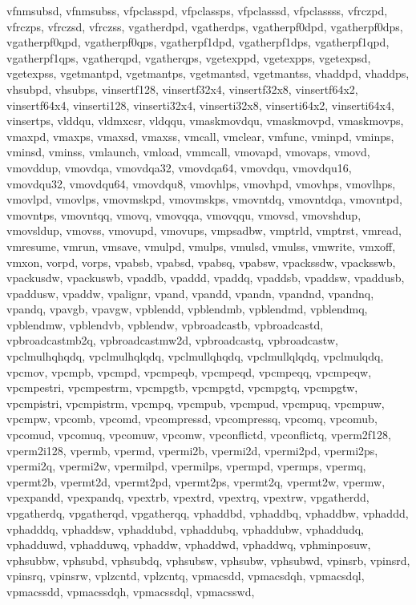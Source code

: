{{vfnmsubsd, vfnmsubss, vfpclasspd, vfpclassps, vfpclasssd, vfpclassss, vfrczpd,
vfrczps, vfrczsd, vfrczss, vgatherdpd, vgatherdps, vgatherpf0dpd, vgatherpf0dps,
vgatherpf0qpd, vgatherpf0qps, vgatherpf1dpd, vgatherpf1dps, vgatherpf1qpd,
vgatherpf1qps, vgatherqpd, vgatherqps, vgetexppd, vgetexpps, vgetexpsd,
vgetexpss, vgetmantpd, vgetmantps, vgetmantsd, vgetmantss, vhaddpd, vhaddps,
vhsubpd, vhsubps, vinsertf128, vinsertf32x4, vinsertf32x8, vinsertf64x2,
vinsertf64x4, vinserti128, vinserti32x4, vinserti32x8, vinserti64x2,
vinserti64x4, vinsertps, vlddqu, vldmxcsr, vldqqu, vmaskmovdqu, vmaskmovpd,
vmaskmovps, vmaxpd, vmaxps, vmaxsd, vmaxss, vmcall, vmclear, vmfunc, vminpd,
vminps, vminsd, vminss, vmlaunch, vmload, vmmcall, vmovapd, vmovaps, vmovd,
vmovddup, vmovdqa, vmovdqa32, vmovdqa64, vmovdqu, vmovdqu16, vmovdqu32,
vmovdqu64, vmovdqu8, vmovhlps, vmovhpd, vmovhps, vmovlhps, vmovlpd, vmovlps,
vmovmskpd, vmovmskps, vmovntdq, vmovntdqa, vmovntpd, vmovntps, vmovntqq, vmovq,
vmovqqa, vmovqqu, vmovsd, vmovshdup, vmovsldup, vmovss, vmovupd, vmovups,
vmpsadbw, vmptrld, vmptrst, vmread, vmresume, vmrun, vmsave, vmulpd, vmulps,
vmulsd, vmulss, vmwrite, vmxoff, vmxon, vorpd, vorps, vpabsb, vpabsd, vpabsq,
vpabsw, vpackssdw, vpacksswb, vpackusdw, vpackuswb, vpaddb, vpaddd, vpaddq,
vpaddsb, vpaddsw, vpaddusb, vpaddusw, vpaddw, vpalignr, vpand, vpandd, vpandn,
vpandnd, vpandnq, vpandq, vpavgb, vpavgw, vpblendd, vpblendmb, vpblendmd,
vpblendmq, vpblendmw, vpblendvb, vpblendw, vpbroadcastb, vpbroadcastd,
vpbroadcastmb2q, vpbroadcastmw2d, vpbroadcastq, vpbroadcastw, vpclmulhqhqdq,
vpclmulhqlqdq, vpclmullqhqdq, vpclmullqlqdq, vpclmulqdq, vpcmov, vpcmpb, vpcmpd,
vpcmpeqb, vpcmpeqd, vpcmpeqq, vpcmpeqw, vpcmpestri, vpcmpestrm, vpcmpgtb,
vpcmpgtd, vpcmpgtq, vpcmpgtw, vpcmpistri, vpcmpistrm, vpcmpq, vpcmpub, vpcmpud,
vpcmpuq, vpcmpuw, vpcmpw, vpcomb, vpcomd, vpcompressd, vpcompressq, vpcomq,
vpcomub, vpcomud, vpcomuq, vpcomuw, vpcomw, vpconflictd, vpconflictq,
vperm2f128, vperm2i128, vpermb, vpermd, vpermi2b, vpermi2d, vpermi2pd,
vpermi2ps, vpermi2q, vpermi2w, vpermilpd, vpermilps, vpermpd, vpermps, vpermq,
vpermt2b, vpermt2d, vpermt2pd, vpermt2ps, vpermt2q, vpermt2w, vpermw, vpexpandd,
vpexpandq, vpextrb, vpextrd, vpextrq, vpextrw, vpgatherdd, vpgatherdq,
vpgatherqd, vpgatherqq, vphaddbd, vphaddbq, vphaddbw, vphaddd, vphadddq,
vphaddsw, vphaddubd, vphaddubq, vphaddubw, vphaddudq, vphadduwd, vphadduwq,
vphaddw, vphaddwd, vphaddwq, vphminposuw, vphsubbw, vphsubd, vphsubdq, vphsubsw,
vphsubw, vphsubwd, vpinsrb, vpinsrd, vpinsrq, vpinsrw, vplzcntd, vplzcntq,
vpmacsdd, vpmacsdqh, vpmacsdql, vpmacssdd, vpmacssdqh, vpmacssdql, vpmacsswd,
}}
